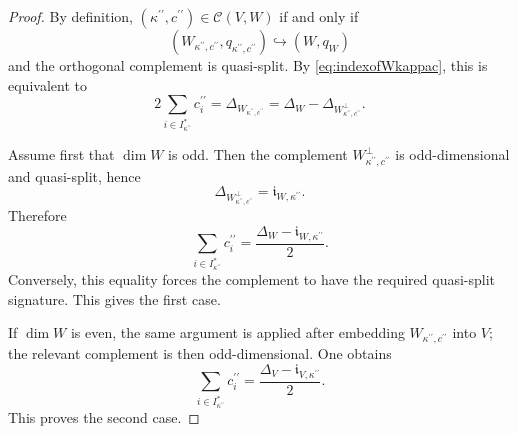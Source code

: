 \documentclass[10pt,a4paper]{amsart}
\newcommand{\CC}{{\mathcal {C}}}
\def\Del{{\Delta}}
\newcommand{\Fi}{{\mathfrak {i}}}
\def\p{\prime}
\begin{document}
\begin{proof}
By definition, $(\kappa^{\p\p},c^{\p\p})\in \CC(V,W)$ if and only if
\[
(W_{\kappa^{\p\p},c^{\p\p}},q_{\kappa^{\p\p},c^{\p\p}})
\hookrightarrow (W,q_W)
\]
and the orthogonal complement is quasi-split. By \eqref{eq:indexofWkappac},
this is equivalent to
\[
2\sum_{i\in I^*_{\kappa^{\p\p}}}c_i^{\p\p}
=
\Del_{W_{\kappa^{\p\p},c^{\p\p}}}
=
\Del_W-\Del_{W^\perp_{\kappa^{\p\p},c^{\p\p}}}.
\]

Assume first that $\dim W$ is odd. Then the complement
$W^\perp_{\kappa^{\p\p},c^{\p\p}}$ is odd-dimensional and quasi-split, hence
\[
\Del_{W^\perp_{\kappa^{\p\p},c^{\p\p}}}
=
\Fi_{W,\kappa^{\p\p}}.
\]
Therefore
\[
\sum_{i\in I^*_{\kappa^{\p\p}}}c_i^{\p\p}
=
\frac{\Del_W-\Fi_{W,\kappa^{\p\p}}}{2}.
\]
Conversely, this equality forces the complement to have the required
quasi-split signature. This gives the first case.

If $\dim W$ is even, the same argument is applied after embedding
$W_{\kappa^{\p\p},c^{\p\p}}$ into $V$; the relevant complement is then
odd-dimensional. One obtains
\[
\sum_{i\in I^*_{\kappa^{\p\p}}}c_i^{\p\p}
=
\frac{\Del_V-\Fi_{V,\kappa^{\p\p}}}{2}.
\]
This proves the second case.
\end{proof}
\end{document}
